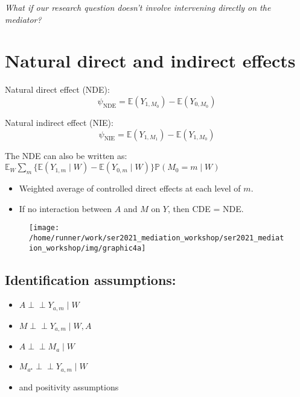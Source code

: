 \documentclass[
  12pt, krantz2,
]{book}
\providecommand{\tightlist}{%
  \setlength{\itemsep}{0pt}\setlength{\parskip}{0pt}}
\theoremstyle{definition}
\theoremstyle{definition}
\theoremstyle{definition}
\newcommand{\indep}{\mbox{$\perp\!\!\!\perp$}}
\renewcommand{\P}{\mathbb{P}}
\newcommand{\E}{\mathbb{E}}
\newcommand{\1}{\mathbbm{1}}
\begin{document}
\emph{What if our research question doesn't involve intervening directly on the
mediator?}

\hypertarget{natural-direct-and-indirect-effects}{%
\section*{Natural direct and indirect effects}\label{natural-direct-and-indirect-effects}}


Natural direct effect (NDE):
\begin{equation*}
  \psi_{\text{NDE}} = \E(Y_{1,M_0}) - \E(Y_{0,M_0})
\end{equation*}

Natural indirect effect (NIE):
\begin{equation*}
  \psi_{\text{NIE}} = \E(Y_{1,M_1}) - \E(Y_{1,M_0})
\end{equation*}

The NDE can also be written as: \(\E_W \sum_m \{\E(Y_{1,m} \mid W) - \E(Y_{0,m} \mid W)\} \P(M_{0}=m \mid W)\)

\begin{itemize}
\tightlist
\item
  Weighted average of controlled direct effects at each level of \(m\).
\item
  If no interaction between \(A\) and \(M\) on \(Y\), then CDE = NDE.
\end{itemize}

\begin{figure}

{\centering \texttt{[image: /home/runner/work/ser2021\_mediation\_workshop/ser2021\_mediation\_workshop/img/graphic4a]} 

}

\end{figure}

\hypertarget{identification-assumptions}{%
\subsection{Identification assumptions:}\label{identification-assumptions}}

\begin{itemize}
\tightlist
\item
  \(A \indep Y_{a,m} \mid W\)
\item
  \(M \indep Y_{a,m} \mid W, A\)
\item
  \(A \indep M_a \mid W\)
\item
  \(M_{a^{\star}} \indep Y_{a,m} \mid W\)
\item
  and positivity assumptions
\end{itemize}
\end{document}
